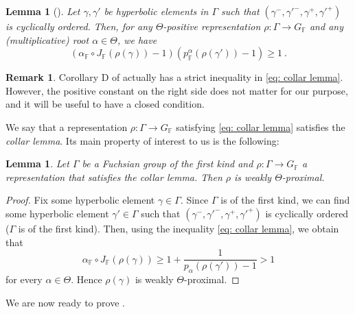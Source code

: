 \documentclass{amsart}
\theoremstyle{plain}
\newtheorem{lemma}[proposition]{Lemma}
\theoremstyle{definition}
\newtheorem{remark}[proposition]{Remark}
\DeclareMathOperator{\Fb}{{\mathbb{F}}}
\newcommand{\1}{\mathbf{1}}
\begin{document}
\begin{lemma}[{\cite[Corollary D]{BeyrerGuichardLabouriePozzettiWienhard_PositivityCrossRatiosCollarLemma}}]
\label{lem: collar lemma}
    Let $\gamma, \gamma'$ be hyperbolic elements in $\Gamma$ such that $(\gamma^-, \gamma'^-, \gamma^+ ,\gamma'^+)$ is cyclically ordered.
    Then, for any $\Theta$-positive representation $\rho \colon \Gamma \to G_{\Fb}$ and any (multiplicative) root $\alpha\in \Theta$, we have
    \begin{equation} \label{eq: collar lemma}
    (\alpha_{\Fb}\circ J_{\Fb}(\rho(\gamma))-1)(p^\alpha_{\Fb}(\rho(\gamma'))-1) \geq 1~.
    \end{equation}
\end{lemma}
\begin{remark}
    Corollary D of \cite{BeyrerGuichardLabouriePozzettiWienhard_PositivityCrossRatiosCollarLemma} actually has a strict inequality in \eqref{eq: collar lemma}. However, the positive constant on the right side does not matter for our purpose, and it will be useful to have a closed condition.
\end{remark}

We say that a representation $\rho \colon \Gamma \to G_{\Fb}$ satisfying \eqref{eq: collar lemma} satisfies the \emph{collar lemma}.
Its main property of interest to us is the following:

\begin{lemma}
    \label{lem: collar lemma implies proximal}
    Let $\Gamma$ be a Fuchsian group of the first kind and $\rho\colon\Gamma \to G_{\Fb}$ a representation that satisfies the collar lemma.
    Then $\rho$ is weakly $\Theta$-proximal.
\end{lemma}
\begin{proof}
    Fix some hyperbolic element $\gamma \in \Gamma$. Since $\Gamma$ is of the first kind, we can find some hyperbolic element $\gamma'\in \Gamma$ such that $(\gamma^-, \gamma'^-, \gamma^+ ,\gamma'^+)$ is cyclically ordered ($\Gamma$ is of the first kind). Then, using the inequality \eqref{eq: collar lemma}, we obtain that
    \[\alpha_{\Fb}\circ J_{\Fb}(\rho(\gamma)) \geq 1 + \frac{1}{p_{\alpha}(\rho(\gamma'))-1}> 1\]
    for every $\alpha\in \Theta$.
    Hence $\rho(\gamma)$ is weakly $\Theta$-proximal.
\end{proof}

We are now ready to prove .
\end{document}
